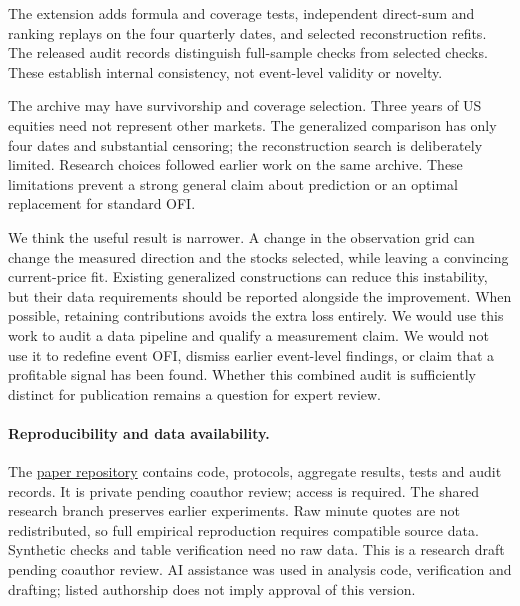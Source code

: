 \documentclass[11pt]{article}
\begin{document}
The extension adds formula and coverage tests, independent direct-sum and ranking replays on the four quarterly dates, and selected reconstruction refits. The released audit records distinguish full-sample checks from selected checks. These establish internal consistency, not event-level validity or novelty.

The archive may have survivorship and coverage selection. Three years of US equities need not represent other markets. The generalized comparison has only four dates and substantial censoring; the reconstruction search is deliberately limited. Research choices followed earlier work on the same archive. These limitations prevent a strong general claim about prediction or an optimal replacement for standard OFI.

We think the useful result is narrower. A change in the observation grid can change the measured direction and the stocks selected, while leaving a convincing current-price fit. Existing generalized constructions can reduce this instability, but their data requirements should be reported alongside the improvement. When possible, retaining contributions avoids the extra loss entirely. We would use this work to audit a data pipeline and qualify a measurement claim. We would not use it to redefine event OFI, dismiss earlier event-level findings, or claim that a profitable signal has been found. Whether this combined audit is sufficiently distinct for publication remains a question for expert review.

\paragraph{Reproducibility and data availability.}
The \href{https://github.com/brendanconnelly/snapshot-ofi-paper}{paper repository} contains code, protocols, aggregate results, tests and audit records. It is private pending coauthor review; access is required. The shared research branch preserves earlier experiments. Raw minute quotes are not redistributed, so full empirical reproduction requires compatible source data. Synthetic checks and table verification need no raw data. This is a research draft pending coauthor review. AI assistance was used in analysis code, verification and drafting; listed authorship does not imply approval of this version.
\end{document}
